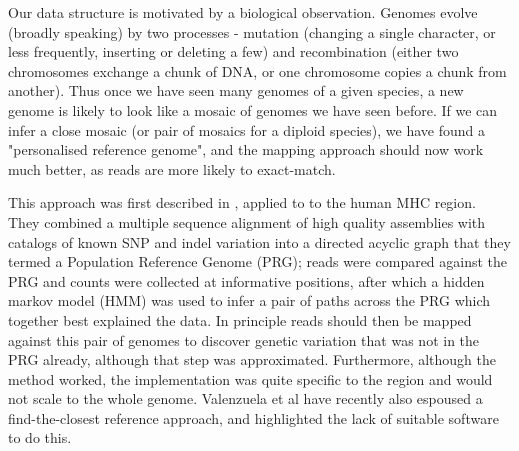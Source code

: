 \documentclass[runningheads,a4paper]{llncs}
\begin{document}
Our data structure is motivated by a biological observation. Genomes evolve (broadly speaking) by two processes - mutation (changing a single character, or less frequently, inserting or deleting a few) and recombination (either two chromosomes exchange a chunk of DNA, or one chromosome copies a chunk from another). Thus once we have seen many genomes of a given species, a new genome is likely to look like a mosaic of genomes we have seen before.  If we can infer a close mosaic (or pair of mosaics for a diploid species), we have found a "personalised reference genome", and the mapping approach should now work much better, as reads are more likely to exact-match. 

This approach was first described in \cite{dilthey}, applied to to the human MHC region. They combined a multiple sequence alignment of high quality assemblies with catalogs of known SNP and indel variation into a directed acyclic graph that they termed a Population Reference Genome (PRG); reads were compared against the PRG and counts were collected at informative positions, after which a hidden markov model (HMM) was used to infer a pair of paths across the PRG which together best explained the data. In principle reads should then be mapped against this pair of genomes to discover genetic variation that was not in the PRG already, although that step was approximated. Furthermore, although the method worked, the implementation was quite specific to the region and would not scale to the whole genome. Valenzuela et al \cite{valen} have recently also espoused a find-the-closest reference approach, and highlighted the lack of suitable software to do this.
\end{document}
